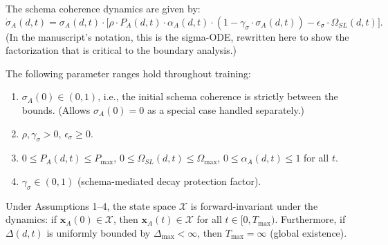 
\begin{definition}
The schema coherence dynamics are given by:
\begin{equation}\label{eq:sigma-ode-recon}
\dot{\sigma}_A(d,t) = \sigma_A(d,t) \cdot
\bigl[ \rho \cdot P_A(d,t) \cdot \alpha_A(d,t) \cdot (1 - \gamma_\sigma \cdot \sigma_A(d,t))
- \epsilon_\sigma \cdot \Omega_{SL}(d,t) \bigr].
\end{equation}
(In the manuscript's notation, this is the sigma-ODE, rewritten here to show the
factorization that is critical to the boundary analysis.)
\end{definition}

\begin{assumption}
The following parameter ranges hold throughout training:
\begin{enumerate}[nosep]
\item $\sigma_A(0) \in (0, 1)$, i.e., the initial schema coherence is
  strictly between the bounds. (Allows $\sigma_A(0) = 0$ as a special
  case handled separately.)
\item $\rho, \gamma_\sigma > 0$, $\epsilon_\sigma \geq 0$.
\item $0 \leq P_A(d,t) \leq P_{\max}$, $0 \leq \Omega_{SL}(d,t) \leq \Omega_{\max}$,
  $0 \leq \alpha_A(d,t) \leq 1$ for all $t$.
\item $\gamma_\sigma \in (0, 1)$ (schema-mediated decay protection factor).
\end{enumerate}
\end{assumption}

\begin{proposition}
\label{prop:invariance}
Under Assumptions 1--4, the state space $\mathcal{X}$ is
forward-invariant under the dynamics: if $\mathbf{x}_A(0) \in \mathcal{X}$,
then $\mathbf{x}_A(t) \in \mathcal{X}$ for all $t \in [0, T_{\max})$.
Furthermore, if $\Delta(d,t)$ is uniformly bounded by $\Delta_{\max} < \infty$,
then $T_{\max} = \infty$ (global existence).
\end{proposition}

